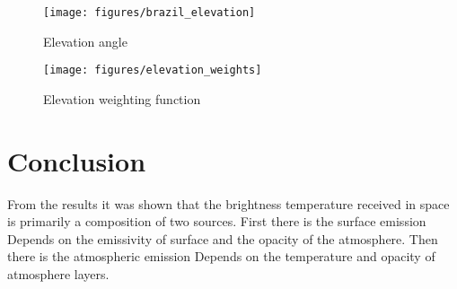 \documentclass[twocol]{ametsoc}
\begin{document}
\begin{figure}
	\centering
	\texttt{[image: figures/brazil\_elevation]}
	\caption{Elevation angle}
	\label{fig:elevation}
\end{figure}

\begin{figure}
	\centering
	\texttt{[image: figures/elevation\_weights]}
	\caption{Elevation weighting function}
	\label{fig:elevation_weight}
\end{figure}

\section{Conclusion}

From the results it was shown that the brightness temperature received in space is primarily a composition of two sources.
First there is the surface emission
Depends on the emissivity of surface and the opacity of the atmosphere.
Then there is the atmospheric emission
Depends on the temperature and opacity of atmosphere layers.


 
 
\end{document}
